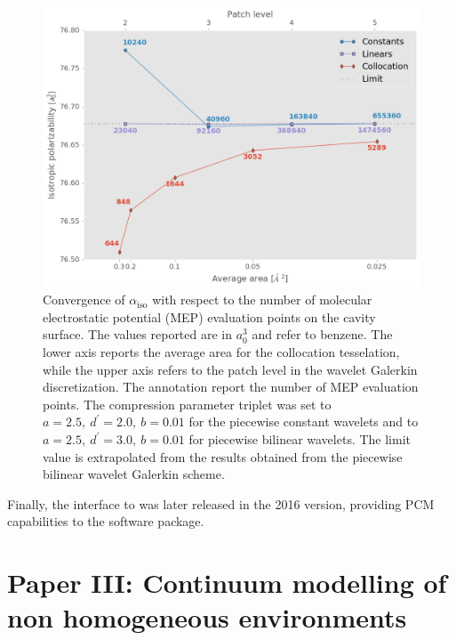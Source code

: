 \begin{figure}[tb]
 \centering
  \includegraphics[width=\textwidth]{gfx/wemlin/alpha_convergence.png}
  \caption[Convergence of $\alpha_\mathrm{iso}$ with respect to the number of molecular
  electrostatic potential (MEP) evaluation points on the cavity surface.]
  {Convergence of $\alpha_\mathrm{iso}$ with respect to the number of
   molecular electrostatic potential (MEP) evaluation points on the cavity
   surface.
   The values reported are in $a_0^3$ and refer to benzene.
   The lower axis reports the average area for the collocation
   tesselation, while the upper axis refers to the patch level in the
   wavelet Galerkin discretization. The annotation report the number of
   MEP evaluation points.
   The compression parameter triplet was set to $a = 2.5,\ d^\prime =
   2.0,\ b = 0.01$ for the piecewise constant wavelets and to $a = 2.5,\
   d^\prime = 3.0,\ b = 0.01$ for piecewise bilinear wavelets.
   The limit value is extrapolated from the results obtained from the
   piecewise bilinear wavelet Galerkin scheme.}
  \label{fig:alpha_convergence}
\end{figure}

Finally, the interface to \LSDALTON was later released in the 2016 version,
providing \acs{PCM} capabilities to the software package.

\section*{Paper III: Continuum modelling of non homogeneous environments}


